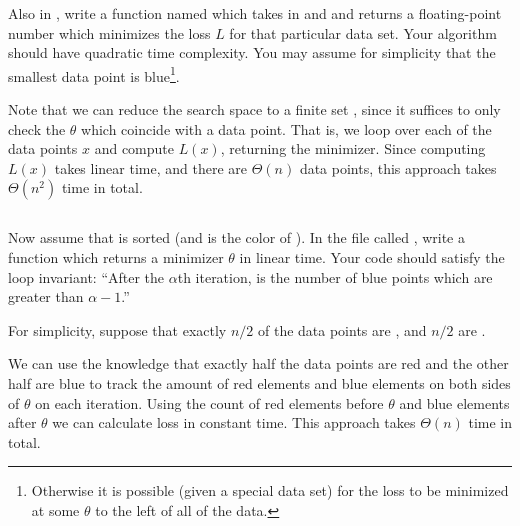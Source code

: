 \begin{progprob}
\begin{subprobset}
\begin{subprob}
        \end{subprob}

        \begin{subprob}
            Also in , write a function named 
            which takes in  and  and returns a floating-point
            number which minimizes the loss $L$ for that particular data set.
            Your algorithm should have quadratic time complexity. You may
            assume for simplicity that the smallest data point is
            blue\footnote{Otherwise it is possible (given a special data set) for the
                loss to be minimized at some $\theta$ to the left of all of the
            data.}.

            \begin{soln}
                Note that we can reduce the search space to a finite set ,
                since it suffices to only check the $\theta$ which coincide
                with a data point.  That is, we loop over each of the data
                points $x$ and compute $L(x)$, returning the minimizer.
                Since computing $L(x)$ takes linear time, and there are
                $\Theta(n)$ data points, this approach takes $\Theta(n^2)$
                time in total.

                \inputminted{python}{\thisdir/include-solution/minimize_ell.py}
            \end{soln}
            
        \end{subprob}


        \begin{subprob}
            Now assume that  is sorted (and 
            is the color of ). In the file called
            , write a function
             which returns a minimizer $\theta$
            in linear time. Your code should satisfy the loop invariant: ``After the
            $\alpha$th iteration,  is the number of blue points
            which are greater than \python{data[}$\alpha - 1$\python{]}.''

            For simplicity, suppose that exactly $n/2$ of the data points are
            , and $n/2$ are .

            \begin{soln}
                We can use the knowledge that exactly half the data points are
                red and the other half are blue to track the amount of red elements 
                and blue elements on both sides of $\theta$ on each iteration. Using
                the count of red elements before $\theta$ and blue elements after $\theta$
                we can calculate loss in constant time. This approach takes $\Theta(n)$ 
                time in total.
                

\end{soln}
\end{subprob}
\end{subprobset}
\end{progprob}
